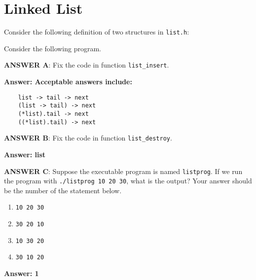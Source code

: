 \newpage
\section{Linked List}

Consider the following definition of two structures in \texttt{list.h}:

\resetlinenumber[1]
\linenumbers
\begin{tt}
	
\end{tt}
\nolinenumbers

Consider the following program.

\resetlinenumber[1]
\linenumbers
\begin{tt}
  
\end{tt}
\nolinenumbers

{\bf ANSWER A}: Fix the code in function \texttt{list\_insert}.

\ifexam

\else

{\bf Answer: Acceptable answers include:}
\begin{verbatim}
	list -> tail -> next
	(list -> tail) -> next
	(*list).tail -> next
	((*list).tail) -> next
\end{verbatim}

\fi

{\bf ANSWER B}: Fix the code in function \texttt{list\_destroy}.

\ifexam

\else

{\bf Answer: list}

\fi

{\bf ANSWER C}: Suppose the executable program is named {\tt listprog}. If we run the program with \texttt{./listprog 10 20 30}, what is the output? Your answer should be the number of the statement below.

\begin{enumerate}
	\item \texttt{10 20 30}
	\item \texttt{30 20 10}
	\item \texttt{10 30 20}
	\item \texttt{30 10 20}
\end{enumerate}

\ifexam

\else

{\bf Answer: 1}

\fi